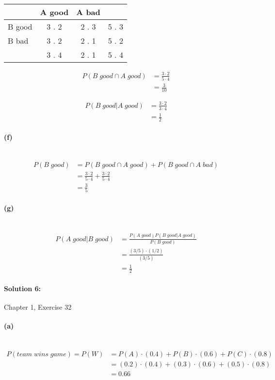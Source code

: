 \documentclass[a4paper]{article}
\begin{document}
\begin{tabular}{l c c | r}
       & A good & A bad \\
\hline
B good & 3 . 2  & 2 . 3 & 5 . 3 \\
B bad  & 3 . 2  & 2 . 1 & 5 . 2 \\
\hline
       & 3 . 4  & 2 . 1 & 5 . 4
\end{tabular}

\begin{align*}
P(B \; good \cap A \; good) &= \frac{3 \cdot 2}{5 \cdot 4} \\
                            &= \frac{3}{10}
\end{align*}

\begin{align*}
P(B \; good | A \; good) &= \frac{3 \cdot 2}{3 \cdot 4} \\
                            &= \frac{1}{2}
\end{align*}

\paragraph{(f)} ~\\
\begin{align*}
P(B \; good) &= P(B \; good \cap A \; good) + P(B \; good \cap A \; bad) \\
             &= \frac{3 \cdot 2}{5 \cdot 4} + \frac{3 \cdot 2}{5 \cdot 4} \\
             &= \frac{3}{5}
\end{align*}

\paragraph{(g)} ~\\
\begin{align*}
P(A \; good | B \; good) &= \frac{P(A \; good) P(B \; good | A \; good)}{P(B \; good)} \\
                         &= \frac{(3/5) \cdot (1/2)}{(3/5)} \\
                         &= \frac{1}{2}
\end{align*}

\paragraph{Solution 6:}
Chapter 1, Exercise 32

\paragraph{(a)} ~\\
\begin{align*}
P(team \; wins \; game) = P(W) &= P(A) \cdot (0.4) + P(B) \cdot (0.6) + P(C) \cdot (0.8) \\
                               &= (0.2) \cdot (0.4) + (0.3) \cdot (0.6) + (0.5) \cdot (0.8) \\
                               &= 0.66
\end{align*}
\end{document}
